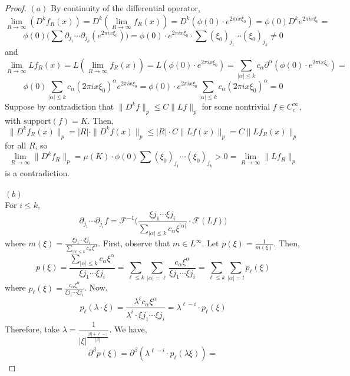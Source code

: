 \documentclass[12pt]{article}
\begin{document}
\begin{proof}
  $(a)$ By continuity of the differential operator,
  $$
    \lim_{R \rightarrow \infty} (D^k f_R(x)) =
    D^k(\lim_{R \rightarrow \infty} f_R(x)) =
    D^k(\phi(0) \cdot e^{2 \pi i x \xi_0}) =
    \phi(0)  D^k e^{2 \pi i x \xi_0} =
  $$
  $$
    \phi(0) \Big( \sum \partial_{j_1} \cdots \partial_{j_k}(e^{2 \pi i x \xi_0}) \Big) =
    \phi(0) \cdot e^{2 \pi i x \xi_0}  \cdot \sum (\xi_0)_{j_1} \cdots (\xi_0)_{j_k} \ne 0
  $$
  and
  $$
    \lim_{R \rightarrow \infty} L f_R(x) =
    L(\lim_{R \rightarrow \infty} f_R(x)) =
    L(\phi(0) \cdot e^{2 \pi i x \xi_0}) =
    \sum_{|\alpha| \le k}  c_\alpha \partial^\alpha (\phi(0) \cdot e^{2 \pi i x \xi_0}) =
  $$
  $$
    \phi(0) \sum_{|\alpha| \le k}  c_\alpha (2 \pi i x \xi_0)^\alpha e^{2 \pi i x \xi_0}  =
    \phi(0) \cdot e^{2 \pi i x \xi_0} \sum_{|\alpha| \le k}  c_\alpha (2 \pi i x \xi_0)^\alpha =
    0
  $$
  Suppose by contradiction that $\|D^k f\|_p \le C  \|Lf\|_p$ for some nontrivial $f \in C^\infty_c$, with $\text{support}(f) = K$. Then,
  $$
    \|D^k f_R(x)\|_p =
    |R| \cdot \|D^k f(x)\|_p \le
    |R| \cdot C \|Lf(x)\|_p =
    C \|Lf_R(x)\|_p
  $$
  for all $R$, so
  $$
    \lim_{R \rightarrow \infty} \|D^k f_R\|_p =
    \mu(K) \cdot \phi(0) \sum (\xi_0)_{j_1} \cdots (\xi_0)_{j_k} >
    0 =
    \lim_{R \rightarrow \infty} \|Lf_R\|_p
  $$
  is a contradiction.\\\\
  $(b)$\\
  For  $i \le k$,
  $$
    \partial_{j_1} \cdots \partial_{j_i} f =
    \mathcal{F}^{-1}\Big( \dfrac{\xi{j_1} \cdots \xi{j_i}}{\sum_{|\alpha| \le k} c_\alpha \xi^{|\alpha|}} \cdot \mathcal{F}(Lf) \Big)
  $$
  where $m(\xi) = \frac{\xi{j_1} \cdots \xi{j_i}}{\sum_{|\alpha| \le k}c_\alpha \xi^{\alpha}}$. First, observe that $m \in L^\infty$. Let $p(\xi) = \frac{1}{m(\xi)}$. Then,
  $$
    p(\xi) =
    \frac{\sum_{|\alpha| \le k}c_\alpha \xi^{\alpha}}{\xi{j_1} \cdots \xi{j_i}} =
    \sum_{\ell \le k} \sum_{|\alpha| = \ell} \frac{c_\alpha \xi^{\alpha}}{\xi{j_1} \cdots \xi{j_i}} =
    \sum_{\ell \le k} \sum_{|\alpha| = l} p_\ell(\xi)
  $$
  where $p_\ell(\xi) = \frac{c_\alpha \xi^{\alpha}}{\xi{j_1} \cdots \xi{j_i}}$.
  Now,
  $$
    p_\ell(\lambda \cdot \xi) =
    \frac{\lambda^\ell c_\alpha \xi^{\alpha}}{\lambda^i \cdot \xi{j_1} \cdots \xi{j_i}} =
    \lambda^{\ell - i} \cdot p_\ell(\xi)
  $$
  Therefore, take $\lambda = \dfrac{1}{|\xi|^{\frac{|\beta| + \ell -i}{|\beta|}}}$. We have,
  $$
    \partial^\beta p(\xi) =
    \partial^\beta(\lambda^{\ell - i} \cdot p_\ell(\lambda \xi)) =
$$
\end{proof}
\end{document}
